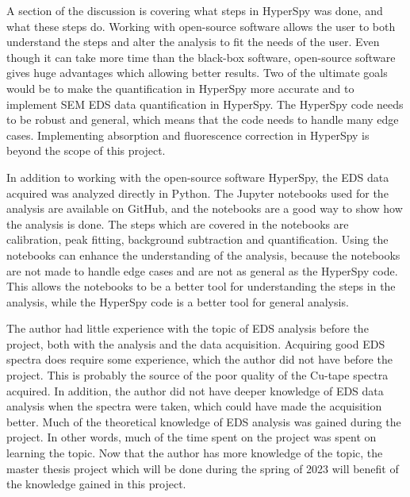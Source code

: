 A section of the discussion is covering what steps in HyperSpy was done, and what these steps do.
Working with open-source software allows the user to both understand the steps and alter the analysis to fit the needs of the user.
Even though it can take more time than the black-box software, open-source software gives huge advantages which allowing better results.
Two of the ultimate goals would be to make the quantification in HyperSpy more accurate and to implement SEM EDS data quantification in HyperSpy.
The HyperSpy code needs to be robust and general, which means that the code needs to handle many edge cases.
Implementing absorption and fluorescence correction in HyperSpy is beyond the scope of this project.

In addition to working with the open-source software HyperSpy, the EDS data acquired was analyzed directly in Python.
The Jupyter notebooks used for the analysis are available on GitHub, and the notebooks are a good way to show how the analysis is done.
The steps which are covered in the notebooks are calibration, peak fitting, background subtraction and quantification.
Using the notebooks can enhance the understanding of the analysis, because the notebooks are not made to handle edge cases and are not as general as the HyperSpy code.
This allows the notebooks to be a better tool for understanding the steps in the analysis, while the HyperSpy code is a better tool for general analysis.









The author had little experience with the topic of EDS analysis before the project, both with the analysis and the data acquisition.
Acquiring good EDS spectra does require some experience, which the author did not have before the project.
This is probably the source of the poor quality of the Cu-tape spectra acquired.
In addition, the author did not have deeper knowledge of EDS data analysis when the spectra were taken, which could have made the acquisition better.
Much of the theoretical knowledge of EDS analysis was gained during the project.
In other words, much of the time spent on the project was spent on learning the topic.
Now that the author has more knowledge of the topic, the master thesis project which will be done during the spring of 2023 will benefit of the knowledge gained in this project.


